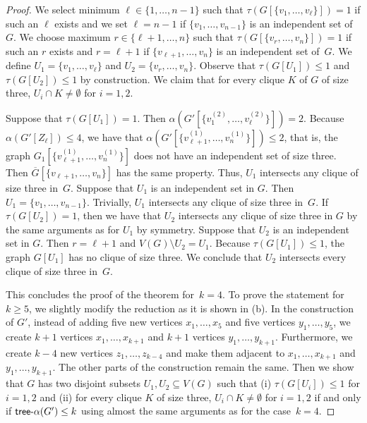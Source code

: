 \documentclass[11pt]{article}
\theoremstyle{definition}
\newcommand{\tin}{\mathsf{tree} \textnormal{-} \alpha}
\begin{document}
\begin{proof}
We select minimum $\ell\in\{1,\ldots,n-1\}$ such that $\tau(G[\{v_1,\ldots,v_\ell\}])=1$ if such an $\ell$ exists and we set $\ell=n-1$ if $\{v_1,\ldots,v_{n-1}\}$ is an independent set of~$G$.
We choose maximum $r\in\{\ell+1,\ldots,n\}$ such that $\tau(G[\{v_r,\ldots,v_n\}])=1$ if such an $r$ exists and $r=\ell+1$ if $\{v_{\ell+1},\ldots,v_n\}$ is an independent set of~$G$. We define $U_1=\{v_1,\ldots,v_\ell\}$ and
$U_2=\{v_r,\ldots,v_n\}$. Observe that $\tau(G[U_1])\leq 1$ and $\tau(G[U_2])\leq 1$ by construction. We claim that for every clique $K$ of $G$ of size three, $U_i\cap K\neq \emptyset$ for $i=1,2$.

Suppose that $\tau(G[U_1])=1$. Then $\alpha(G'[\{v_1^{(2)},\ldots,v_\ell^{(2)}\}])=2$. Because $\alpha(G'[Z_\ell])\leq 4$, we have that $\alpha(G'[\{v_{\ell+1}^{(1)},\ldots,v_n^{(1)}\}])\leq 2$, that is, the graph  $G_1[\{v_{\ell+1}^{(1)},\ldots,v_n^{(1)}\}]$ does not have an independent set of size three.
Then $\overline{G}[\{v_{\ell+1},\ldots,v_n\}]$ has the same property.
Thus, $U_1$ intersects any clique of size three in~$G$.
Suppose that $U_1$ is an independent set in $G$.
Then $U_1=\{v_1,\ldots,v_{n-1}\}$. 
Trivially, $U_1$ intersects any clique of size three in~$G$. 
If $\tau(G[U_2])=1$, then we have that $U_2$ intersects any clique of size three in $G$ by the same arguments as for $U_1$ by symmetry. 
Suppose that $U_2$ is an independent set in $G$. 
Then $r=\ell+1$ and $V(G)\setminus U_2=U_1$. 
Because $\tau(G[U_1])\leq 1$, the graph $G[U_1]$ has no clique of size three.
We conclude that $U_2$ intersects every clique of size three in~$G$.

This concludes the proof of the theorem for~$k=4$. To prove the statement for $k\geq 5$, we slightly modify the reduction as it is shown in  (b). In the construction of $G'$,  instead of adding five new vertices $x_1,\ldots,x_5$ and five vertices $y_1,\ldots,y_5$, we create $k+1$ vertices $x_1,\ldots,x_{k+1}$ and $k+1$ vertices $y_1,\ldots,y_{k+1}$.
Furthermore, we create $k-4$ new vertices $z_1,\ldots,z_{k-4}$ and make them adjacent to  $x_1,\ldots,x_{k+1}$ and $y_1,\ldots,y_{k+1}$. The other parts of the construction remain the same. Then we show that $G$ has two disjoint subsets $U_1,U_2\subseteq V(G)$ such that  (i) $\tau(G[U_i])\leq 1$ for $i=1,2$
and (ii) for every clique $K$ of size three, $U_i\cap K\neq \emptyset$ for $i=1,2$ if and only if $\tin(G')\leq k$ using almost the same arguments as for the case~$k=4$.


\end{proof}
\end{document}
